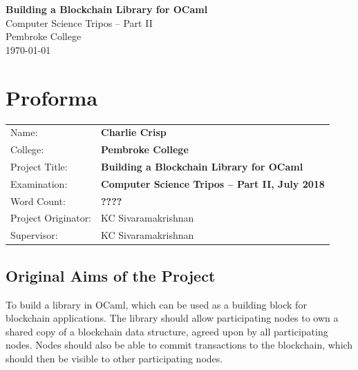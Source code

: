 \documentclass[12pt,a4paper,twoside,openright]{report}
\begin{document}
	
	
	
	
	\pagestyle{empty}
	
	
	\vspace*{60mm}
	\begin{center}
	\Huge
	\textbf{Building a Blockchain Library for OCaml} \\[5mm]
	Computer Science Tripos -- Part II \\[5mm]
	Pembroke College \\[5mm]
	\today  %
	\end{center}
	
	
	\pagestyle{plain}
	
	\chapter*{Proforma}
	
	{\large
	\begin{tabular}{ll}
	Name:               & \bf Charlie Crisp                       \\
	College:            & \bf Pembroke College                     \\
	Project Title:      & \bf Building a Blockchain Library for OCaml \\
	Examination:        & \bf Computer Science Tripos -- Part II, July 2018  \\
	Word Count:         & \bf ????\footnotemark[1]\\
	Project Originator: & KC Sivaramakrishnan                    \\
	Supervisor:         & KC Sivaramakrishnan                    
	\end{tabular}
	}
	
	
	\section*{Original Aims of the Project}
	
	To build a library in OCaml, which can be used as a building block for blockchain applications. 
	The library should allow participating nodes to own a shared copy of a blockchain data structure, agreed upon by all participating nodes.
	Nodes should also be able to commit transactions to the blockchain, which should then be visible to other participating nodes. 
	
\end{document}
